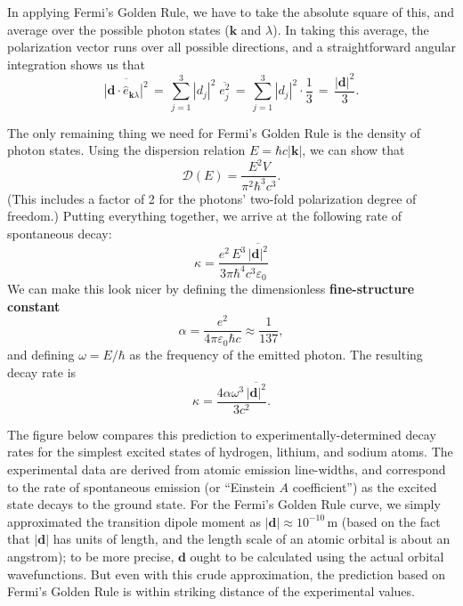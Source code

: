 \documentclass[pra,12pt]{revtex4}
\begin{document}
In applying Fermi's Golden Rule, we have to take the absolute square
of this, and average over the possible photon states ($\mathbf{k}$ and
$\lambda$).  In taking this average, the polarization vector runs over
all possible directions, and a straightforward angular integration
shows us that
\begin{equation}
  \overline{|\mathbf{d}\cdot \hat{e}_{\mathbf{k}\lambda}|^2}
  \,=\, \sum_{j=1}^3 |d_j|^2 \;\overline{e_j^2}
  \,=\, \sum_{j=1}^3 |d_j|^2 \cdot \frac{1}{3}
  \,=\, \frac{|\mathbf{d}|^2}{3}.
\end{equation}


The only remaining thing we need for Fermi's Golden Rule is the
density of photon states.  Using the dispersion relation $E = \hbar c
|\mathbf{k}|$, we can show that
\begin{equation}
  \mathcal{D}(E) = \frac{E^2 V}{\pi^2\hbar^3c^3}.
\end{equation}
(This includes a factor of 2 for the photons' two-fold polarization
degree of freedom.)  Putting everything together, we arrive at the
following rate of spontaneous decay:
\begin{equation}
  \kappa = \frac{e^2\, E^3\, \overline{|\mathbf{d}|^2}}{3\pi\hbar^4c^3\varepsilon_0}
\end{equation}
We can make this look nicer by defining the dimensionless
\textbf{fine-structure constant}
\begin{equation}
  \alpha = \frac{e^2}{4\pi\varepsilon_0\hbar c} \approx \frac{1}{137},
\end{equation}
and defining $\omega = E / \hbar$ as the frequency of the emitted
photon.  The resulting decay rate is
$$\boxed{\;\;\;
  \kappa = \frac{4 \alpha \omega^3\, \overline{|\mathbf{d}|^2}}{3c^2}.
  \;\;\;}
$$
 
The figure below compares this prediction to experimentally-determined
decay rates for the simplest excited states of hydrogen, lithium, and
sodium atoms.  The experimental data are derived from atomic emission
line-widths, and correspond to the rate of spontaneous emission (or
``Einstein $A$ coefficient'') as the excited state decays to the
ground state.  For the Fermi's Golden Rule curve, we simply
approximated the transition dipole moment as $|\mathbf{d}| \approx
10^{-10}\,\mathrm{m}$ (based on the fact that $|\mathbf{d}|$ has units
of length, and the length scale of an atomic orbital is about an
angstrom); to be more precise, $\mathbf{d}$ ought to be calculated
using the actual orbital wavefunctions.  But even with this crude
approximation, the prediction based on Fermi's Golden Rule is within
striking distance of the experimental values.
\end{document}
